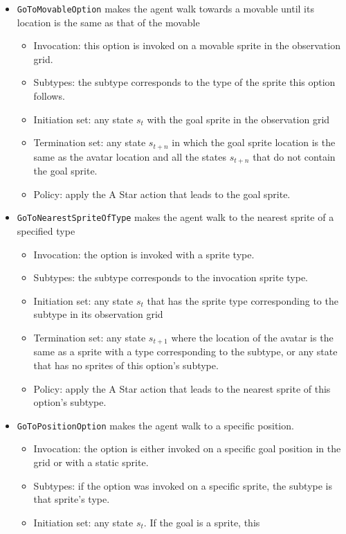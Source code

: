 \begin{itemize}
	\item \texttt{GoToMovableOption} makes the agent walk towards a
		movable until its location is the same as that of the movable
		\begin{itemize}
			\item Invocation: this option is invoked on a movable sprite in the
				observation grid.
			\item Subtypes: the subtype corresponds to the type of the sprite
				this option follows.
			\item Initiation set: any state $s_t$ with the goal sprite in the
				observation grid
			\item Termination set: any state $s_{t+n}$ in which the goal sprite
				location is the same as the avatar location and all the states
				$s_{t+n}$ that do not contain the goal sprite.
			\item Policy: apply the A Star action that leads to the goal sprite.
		\end{itemize}
	\item \texttt{GoToNearestSpriteOfType} makes the agent walk to the nearest
		sprite of a specified type
		\begin{itemize}
			\item Invocation: the option is invoked with a sprite type.
			\item Subtypes: the subtype corresponds to the invocation sprite type.
			\item Initiation set: any state $s_t$ that has the sprite type
				corresponding to the subtype in its observation grid
			\item Termination set: any state $s_{t+1}$ where the location of the
				avatar is the same as a sprite with a type corresponding to
				the subtype, or any state that has no sprites of this option's
				subtype.
			\item Policy: apply the A Star action that leads to the nearest
				sprite of this option's subtype.
		\end{itemize}
	\item \texttt{GoToPositionOption} makes the agent walk to a specific
		position.
		\begin{itemize}
			\item Invocation: the option is either invoked on a specific goal
				position in the grid or with a static sprite.
			\item Subtypes: if the option was invoked on a specific sprite, the
				subtype is that sprite's type.
			\item Initiation set: any state $s_t$. If the goal is a sprite, this

\end{itemize}
\end{itemize}
